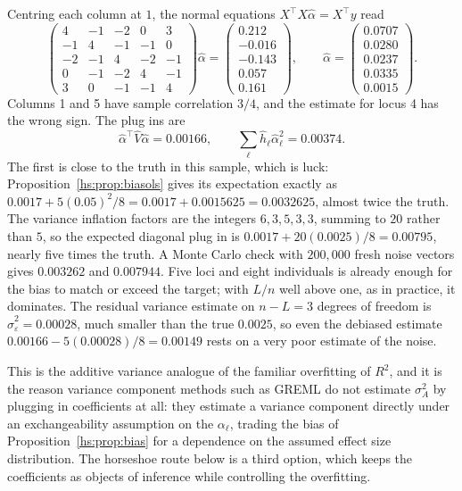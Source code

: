 \begin{example}
Centring each column at $1$, the normal equations $X^\top X\hat\alpha = X^\top y$ read
\[
\begin{pmatrix}
4 & -1 & -2 & 0 & 3\\
-1 & 4 & -1 & -1 & 0\\
-2 & -1 & 4 & -2 & -1\\
0 & -1 & -2 & 4 & -1\\
3 & 0 & -1 & -1 & 4
\end{pmatrix}\hat\alpha
=
\begin{pmatrix}
0.212\\ -0.016\\ -0.143\\ 0.057\\ 0.161
\end{pmatrix},
\qquad
\hat\alpha = \begin{pmatrix}0.0707\\ 0.0280\\ 0.0237\\ 0.0335\\ 0.0015\end{pmatrix}.
\]
Columns 1 and 5 have sample correlation $3/4$, and the estimate for locus 4 has the wrong sign. The plug ins are
\[
\hat\alpha^\top\hat V\hat\alpha = 0.00166, \qquad \sum_\ell\hat h_\ell\hat\alpha_\ell^2 = 0.00374 .
\]
The first is close to the truth in this sample, which is luck: Proposition~\ref{hs:prop:biasols} gives its expectation exactly as $0.0017 + 5(0.05)^2/8 = 0.0017 + 0.0015625 = 0.0032625$, almost twice the truth. The variance inflation factors are the integers $6, 3, 5, 3, 3$, summing to $20$ rather than $5$, so the expected diagonal plug in is $0.0017 + 20(0.0025)/8 = 0.00795$, nearly five times the truth. A Monte Carlo check with $200{,}000$ fresh noise vectors gives $0.003262$ and $0.007944$. Five loci and eight individuals is already enough for the bias to match or exceed the target; with $L/n$ well above one, as in practice, it dominates. The residual variance estimate on $n - L = 3$ degrees of freedom is $\hat\sigma^2_\varepsilon = 0.00028$, much smaller than the true $0.0025$, so even the debiased estimate $0.00166 - 5(0.00028)/8 = 0.00149$ rests on a very poor estimate of the noise.
\end{example}

\begin{remark}
This is the additive variance analogue of the familiar overfitting of $R^2$, and it is the reason variance component methods such as GREML \citep{hs:yang2011gcta} do not estimate $\sigma^2_A$ by plugging in coefficients at all: they estimate a variance component directly under an exchangeability assumption on the $\alpha_\ell$, trading the bias of Proposition~\ref{hs:prop:bias} for a dependence on the assumed effect size distribution. The horseshoe route below is a third option, which keeps the coefficients as objects of inference while controlling the overfitting.
\end{remark}


